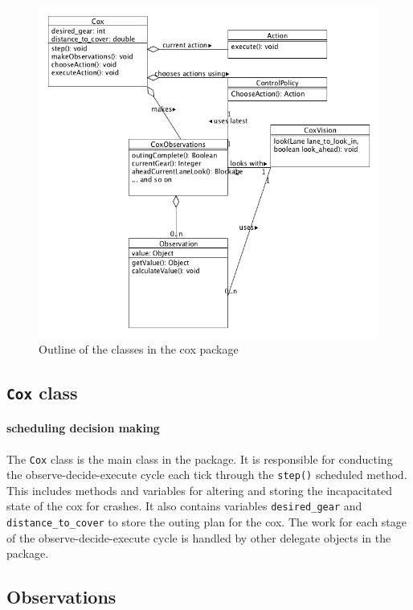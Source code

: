 \begin{figure}
\begin{center}
  \includegraphics[scale=0.3]{images/coxpackageUML.png}
  \caption{Outline of the classes in the cox package}
  \label{software:fig:coxUML}
\end{center}
\end{figure}

\subsection{\texttt{Cox} class}
\paragraph{scheduling decision making}
The \texttt{Cox} class is the main class in the package. It is responsible for conducting the observe-decide-execute cycle each tick through the \texttt{step()} scheduled method. This includes methods and variables for altering and storing the incapacitated state of the cox for crashes. It also contains variables \texttt{desired\_gear} and \texttt{distance\_to\_cover} to store the outing plan for the cox. The work for each stage of the observe-decide-execute cycle is handled by other delegate objects in the package.

\subsection{Observations}

